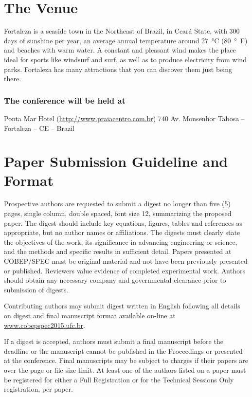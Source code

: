 \documentclass[letterpaper,oneside,onecolumn,draftclsnofoot,12pt,conference]{IEEEtran}
\begin{document}
\section{The Venue}

Fortaleza is a seaside town in the Northeast of Brazil, in Ceará State, with 300 days of sunshine per year, an average annual temperature around \SI{27}{\degreeCelsius} (\SI{80}{\degree F}) and beaches with warm water. A constant and pleasant wind makes the place ideal for sports like windsurf and surf, as well as to produce electricity from wind parks. Fortaleza has many attractions that you can discover them just being there.



\subsubsection{The conference will be held at}
Ponta Mar Hotel (\url{http://www.praiacentro.com.br}) 740 Av. Monsenhor Tabosa -- Fortaleza -- CE -- Brazil

\section{Paper Submission Guideline and Format}

Prospective authors are requested to submit a digest no longer than five (5) pages, single column, double spaced, font size 12, summarizing the proposed paper. The digest should include key equations, figures, tables and references as appropriate, but no author names or affiliations. The digests must clearly state the objectives of the work, its significance in advancing engineering or science, and the methods and specific results in sufficient detail. Papers presented at COBEP/SPEC must be original material and not have been previously presented or published. Reviewers value evidence of completed experimental work. Authors should obtain any necessary company and governmental clearance prior to submission of digests.




Contributing authors may submit digest written in English following all details on digest and final manuscript format available on-line at \url{www.cobepspec2015.ufc.br}.



If a digest is accepted, authors must submit a final manuscript before the deadline or the manuscript cannot be published in the Proceedings or presented at the conference. Final manuscripts may be subject to charges if their papers are over the page or file size limit. At least one of the authors listed on a paper must be registered for either a Full Registration or for the Technical Sessions Only registration, per paper.
\end{document}
